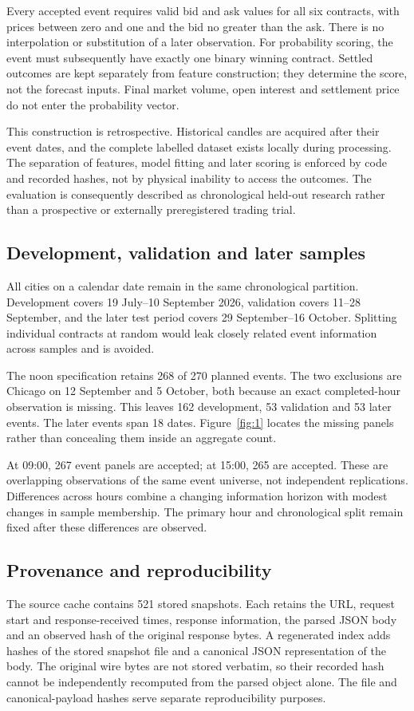 Every accepted event requires valid bid and ask values for all six contracts, with prices between zero and one and the bid no greater than the ask. There is no interpolation or substitution of a later observation. For probability scoring, the event must subsequently have exactly one binary winning contract. Settled outcomes are kept separately from feature construction; they determine the score, not the forecast inputs. Final market volume, open interest and settlement price do not enter the probability vector.

This construction is retrospective. Historical candles are acquired after their event dates, and the complete labelled dataset exists locally during processing. The separation of features, model fitting and later scoring is enforced by code and recorded hashes, not by physical inability to access the outcomes. The evaluation is consequently described as chronological held-out research rather than a prospective or externally preregistered trading trial.

\subsection{Development, validation and later samples}
All cities on a calendar date remain in the same chronological partition. Development covers 19 July--10 September 2026, validation covers 11--28 September, and the later test period covers 29 September--16 October. Splitting individual contracts at random would leak closely related event information across samples and is avoided.


The noon specification retains 268 of 270 planned events. The two exclusions are Chicago on 12 September and 5 October, both because an exact completed-hour observation is missing. This leaves 162 development, 53 validation and 53 later events. The later events span 18 dates. Figure~\ref{fig:1} locates the missing panels rather than concealing them inside an aggregate count.


At 09:00, 267 event panels are accepted; at 15:00, 265 are accepted. These are overlapping observations of the same event universe, not independent replications. Differences across hours combine a changing information horizon with modest changes in sample membership. The primary hour and chronological split remain fixed after these differences are observed.

\subsection{Provenance and reproducibility}
The source cache contains 521 stored snapshots. Each retains the URL, request start and response-received times, response information, the parsed JSON body and an observed hash of the original response bytes. A regenerated index adds hashes of the stored snapshot file and a canonical JSON representation of the body. The original wire bytes are not stored verbatim, so their recorded hash cannot be independently recomputed from the parsed object alone. The file and canonical-payload hashes serve separate reproducibility purposes.


